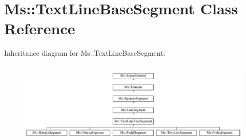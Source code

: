 \hypertarget{class_ms_1_1_text_line_base_segment}{}\section{Ms\+:\+:Text\+Line\+Base\+Segment Class Reference}
\label{class_ms_1_1_text_line_base_segment}
Inheritance diagram for Ms\+:\+:Text\+Line\+Base\+Segment\+:\begin{figure}[H]
\begin{center}
\leavevmode
\includegraphics[height=4.048193cm]{class_ms_1_1_text_line_base_segment}
\end{center}
\end{figure}
